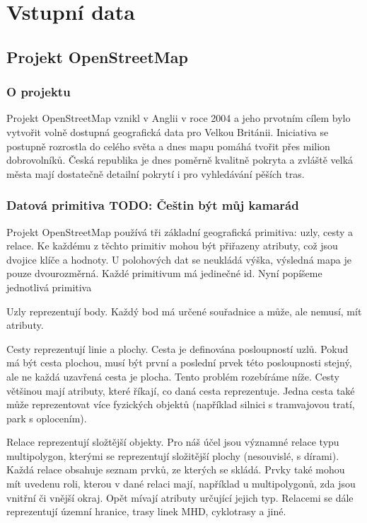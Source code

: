 \chapter{Vstupní data}
\section{Projekt OpenStreetMap}
\subsection{O projektu}
Projekt OpenStreetMap\cite{osmweb} vznikl v Anglii v roce 2004 a jeho prvotním cílem bylo
vytvořit volně dostupná geografická data pro Velkou Británii. Iniciativa se
postupně rozrostla do celého světa a dnes mapu pomáhá tvořit přes milion
dobrovolníků. Česká republika je dnes poměrně kvalitně pokryta a zvláště velká
města mají dostatečně detailní pokrytí i pro vyhledávání pěších tras.
\subsection{Datová primitiva TODO: Češtin být můj kamarád} 
Projekt OpenStreetMap používá tři základní geografická primitiva: uzly, cesty a
relace. Ke každému z těchto primitiv mohou být přiřazeny atributy, což jsou
dvojice klíče a hodnoty. 
U polohových dat se neukládá výška, výsledná mapa je pouze dvourozměrná.
Každé primitivum má jedinečné id.
Nyní popíšeme jednotlivá primitiva

{\tuc Uzly} reprezentují body. Každý bod má určené souřadnice a může, ale nemusí,
mít atributy.

{\tuc Cesty} reprezentují linie a plochy. Cesta je definována posloupností uzlů.
Pokud má být cesta plochou, musí být první a poslední prvek této posloupnosti
stejný, ale ne každá uzavřená cesta je plocha. Tento problém rozebíráme níže.
Cesty většinou mají atributy, které říkají, co daná cesta reprezentuje. Jedna
cesta také může reprezentovat více fyzických objektů (například silnici s
tramvajovou tratí, park s oplocením).

{\tuc Relace} reprezentují složtější objekty. Pro náš účel jsou významné relace
typu multipolygon, kterými se reprezentují složitější plochy (nesouvislé, s
dírami). Každá relace obsahuje seznam prvků, ze kterých se skládá. Prvky také
mohou mít uvedenu roli, kterou v dané relaci mají, například u multipolygonů,
zda jsou vnitřní či vnější okraj. Opět mívají atributy určující jejich typ.
Relacemi se dále reprezentují územní hranice, trasy linek MHD, cyklotrasy a
jiné.

